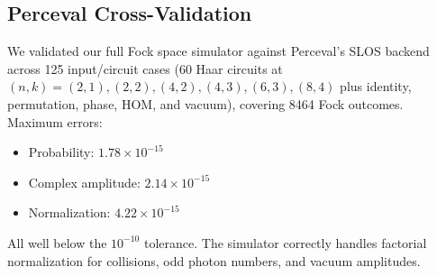\subsection{Perceval Cross-Validation}

We validated our full Fock space simulator against Perceval's SLOS backend~\cite{perceval2023} across 125 input/circuit cases (60 Haar circuits at $(n,k)=(2,1),(2,2),(4,2),(4,3),(6,3),(8,4)$ plus identity, permutation, phase, HOM, and vacuum), covering 8464 Fock outcomes. Maximum errors:
\begin{itemize}
\item Probability: $1.78 \times 10^{-15}$
\item Complex amplitude: $2.14 \times 10^{-15}$
\item Normalization: $4.22 \times 10^{-15}$
\end{itemize}
All well below the $10^{-10}$ tolerance. The simulator correctly handles factorial normalization for collisions, odd photon numbers, and vacuum amplitudes.
